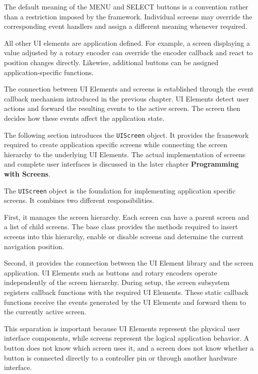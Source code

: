 The default meaning of the MENU and SELECT buttons is a convention rather than
a restriction imposed by the framework. Individual screens may override the
corresponding event handlers and assign a different meaning whenever required.

All other UI elements are application defined. For example, a screen displaying
a value adjusted by a rotary encoder can override the encoder callback and react
to position changes directly. Likewise, additional buttons can be assigned
application-specific functions.

The connection between UI Elements and screens is established through the event
callback mechanism introduced in the previous chapter. UI Elements detect user
actions and forward the resulting events to the active screen. The screen then
decides how these events affect the application state.

The following section introduces the \texttt{UIScreen} object. It provides the
framework required to create application specific screens while connecting the
screen hierarchy to the underlying UI Elements. The actual implementation of
screens and complete user interfaces is discussed in the later chapter
\textbf{Programming with Screens}.


The \texttt{UIScreen} object is the foundation for implementing application
specific screens. It combines two different responsibilities.

First, it manages the screen hierarchy. Each screen can have a parent screen and
a list of child screens. The base class provides the methods required to insert
screens into this hierarchy, enable or disable screens and determine the current
navigation position.

Second, it provides the connection between the UI Element library and the screen
application. UI Elements such as buttons and rotary encoders operate
independently of the screen hierarchy. During setup, the screen subsystem
registers callback functions with the required UI Elements. These static
callback functions receive the events generated by the UI Elements and forward
them to the currently active screen.

This separation is important because UI Elements represent the physical user
interface components, while screens represent the logical application behavior.
A button does not know which screen uses it, and a screen does not know whether
a button is connected directly to a controller pin or through another hardware
interface.

